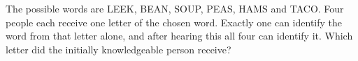 The possible words are LEEK, BEAN, SOUP, PEAS, HAMS and TACO. Four people each receive one letter of the chosen word. Exactly one can identify the word from that letter alone, and after hearing this all four can identify it. Which letter did the initially knowledgeable person receive?
